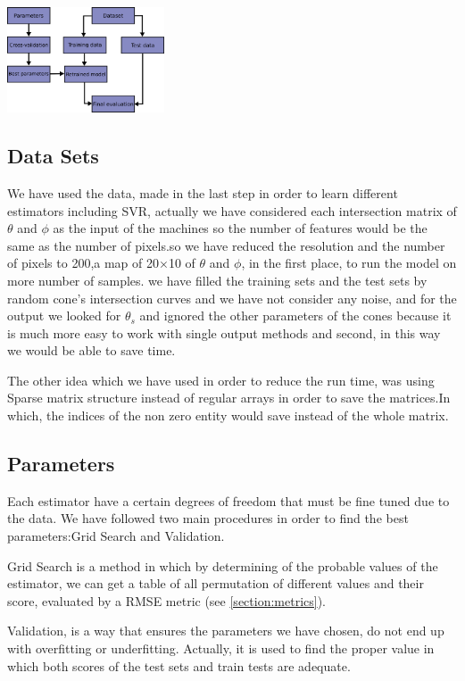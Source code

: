 \documentclass[a4paper,12pt]{article}
\begin{document}
\begin{multicols}{2}
\smallskip
\hspace{+1.5cm}\includegraphics[width=0.35\textwidth]{general view.png}
\label{fig:out look}

\subsection{Data Sets}
\label{section:data}
We have used the data, made in the last step in order to learn different estimators including SVR, actually we have considered each intersection matrix of $\theta$ and $\phi$ as the input of the machines so the number of features would be the same as the number of pixels.so we have reduced the resolution and the number of pixels to 200,a map of 20$\times$10 of $\theta$ and $\phi$, in the first place, to run the model on more number of samples. we have filled the training sets and the test sets by random cone's intersection curves and we have not consider any noise, and for the output we looked for $\theta_s$ and ignored the other parameters of the cones because it is much more easy to work with single output methods and second, in this way we would be able to save time.

The other idea which we have used in order to reduce the run time, was using Sparse matrix structure instead of regular arrays in order to save the matrices.In which, the indices of the non zero entity would save instead of the whole matrix.
\subsection{Parameters}
Each estimator have a certain degrees of freedom that must be fine tuned due to the data. We have followed two main procedures in order to find the best parameters:Grid Search and Validation.

Grid Search is a method in which by determining of the probable values of the estimator, we can get a table of all permutation of different values and their score, evaluated by a RMSE metric (see \ref{section:metrics}).

Validation, is a way that ensures the parameters we have chosen, do not end up with overfitting or underfitting. Actually, it is used to find the proper value in which both scores of the test sets and train tests are adequate.


\end{multicols}
\end{document}
